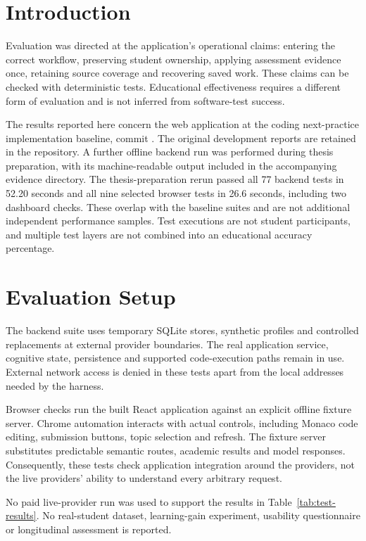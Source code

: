 \section{Introduction}
Evaluation was directed at the application's operational claims: entering the correct workflow, preserving student ownership, applying assessment evidence once, retaining source coverage and recovering saved work. These claims can be checked with deterministic tests. Educational effectiveness requires a different form of evaluation and is not inferred from software-test success.

The results reported here concern the web application at the coding next-practice implementation baseline, commit . The original development reports are retained in the repository. A further offline backend run was performed during thesis preparation, with its machine-readable output included in the accompanying evidence directory. The thesis-preparation rerun passed all 77 backend tests in 52.20 seconds and all nine selected browser tests in 26.6 seconds, including two dashboard checks. These overlap with the baseline suites and are not additional independent performance samples. Test executions are not student participants, and multiple test layers are not combined into an educational accuracy percentage.

\section{Evaluation Setup}
The backend suite uses temporary SQLite stores, synthetic profiles and controlled replacements at external provider boundaries. The real application service, cognitive state, persistence and supported code-execution paths remain in use. External network access is denied in these tests apart from the local addresses needed by the harness.

Browser checks run the built React application against an explicit offline fixture server. Chrome automation interacts with actual controls, including Monaco code editing, submission buttons, topic selection and refresh. The fixture server substitutes predictable semantic routes, academic results and model responses. Consequently, these tests check application integration around the providers, not the live providers' ability to understand every arbitrary request.

No paid live-provider run was used to support the results in Table~\ref{tab:test-results}. No real-student dataset, learning-gain experiment, usability questionnaire or longitudinal assessment is reported.


